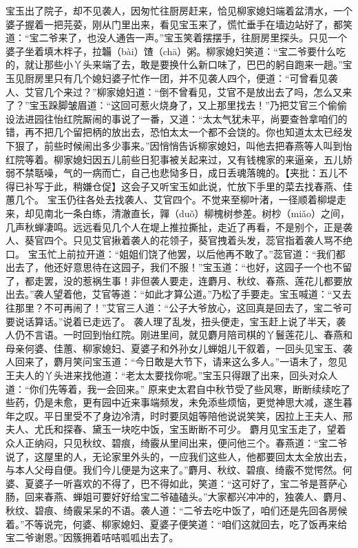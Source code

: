 \documentclass[12pt,oneside]{book}
\begin{document}
宝玉出了院子，却不见袭人，因匆忙往厨房赶来，恰见柳家媳妇端着盆清水，一个婆子握着一把芫荽，刚从门里出来，看见宝玉来了，慌忙垂手在墙边站好了，都笑道：“宝二爷来了，也没人通告一声。”宝玉笑着摆摆手，往厨房里探头。只见一个婆子坐着填木柈子，拉韛（bài）馇（chā）粥。柳家媳妇笑道：“宝二爷要什么吃的，就让那些小丫头来端了去，敢是要换什么新口味了，巴巴的躬自跑来一趟。”宝玉见厨房里只有几个媳妇婆子忙作一团，并不见袭人四个，便道：“可曾看见袭人、艾官几个来过？”柳家媳妇道：“倒不曾看见，艾官不是放出去了吗，怎么又来了？”宝玉跺脚皱眉道：“这回可惹火烧身了，又上那里找去！”乃把艾官三个偷偷设法进园往怡红院厮闹的事说了一番，又道：“太太气犹未平，尚要查咎拿咱们的错，再不把几个留把柄的放出去，恐怕太太一个都不会饶的。你也知道太太已经发下狠了，前些时候闹出多少事来。”因悄悄告诉柳家媳妇，叫他去把春燕等人叫到怡红院等着。柳家媳妇因五儿前些日犯事被关起来过，又有钱槐家的来逼亲，五儿娇弱不禁聒噪，气的一病而亡，自己也悲恸多日，成日丢魂落魄的。【夹批：五儿不得已补写于此，稍嫌仓促】这会子又听宝玉如此说，忙放下手里的菜去找春燕、佳蕙几个。
宝玉仍往各处去找袭人、艾官四个。不觉来至柳叶渚，一径顺着柳堤走来，却见南北一条白练，清澈直长，嚲（duǒ）柳槐树参差。树杪（miǎo）之间，几声秋蝉凄鸣。远远看见几个人在堤上推拉撕扯，走近了再看，不是别个，正是袭人、葵官四个。只见艾官揪着袭人的花领子，葵官拽着头发，蕊官指着袭人骂不绝口。
宝玉忙上前拉开道：“姐姐们饶了他罢，以后他再不敢了。”蕊官道：“我们都出去了，他还好意思待在这园子，我们不服！”宝玉道：“也好，这园子一个也不留了，都走罢，没的惹祸生事！非但袭人要走，连麝月、秋纹、春燕、莲花儿都要放出去。”袭人望着他，艾官等道：“如此才算公道。”乃松了手要走。宝玉喊道：“又去往那里？不可再闹了！”艾官三人道：“公子大爷放心，这回真是回去了，宝二爷可要说话算话。”说着已走远了。
袭人理了乱发，扭头便走，宝玉赶上说了半天，袭人仍不言语。一时回到怡红院。刚进里间，就见麝月陪司棋的丫鬟莲花儿、春燕和母亲何婆、佳蕙、柳家媳妇、夏婆子和外孙女儿蝉姐儿干叙着，一回头见宝玉、袭人回来了，麝月笑问宝玉道：“今日敢是大节下，请来这么多人。”一语未了，忽见王夫人的丫头进来找他道：“老太太要找你呢。”宝玉只得跟了出来，回头对众人道：“你们先等着，我一会回来。”
原来史太君自中秋节受了些风寒，断断续续吃了些药，仍是未愈，更有园中近来事端频发，未免添些烦恼，更觉神思大减，遂生暮年之叹。平日里受不了身边冷清，时时要凤姐等陪他说说笑笑，因拉上王夫人、邢夫人、尤氏和探春、黛玉一块吃中饭，宝玉断断不可少。
麝月见宝玉走了，望着众人正纳闷，只见秋纹、碧痕，绮霰从里间出来，便问他三个。春燕道：“宝二爷说了，这屋里的人，无论家里外头的，一应我们这些人，他都要回太太全放出去，与本人父母自便。我们今儿便是为这来了。”麝月、秋纹、碧痕、绮霰不觉愕然。何婆、夏婆子一听喜欢的不得了，巴不得如此，笑道：“这可好了，宝二爷是菩萨心肠，回来春燕、蝉姐可要好好给宝二爷磕磕头。”大家都兴冲冲的，独袭人、麝月、秋纹、碧痕、绮霰呆呆的不语。袭人道：“二爷去吃中饭了，咱们还是先回各房候着。”不等说完，何婆、柳家媳妇、夏婆子便笑道：“咱们这就回去，吃了饭再来给宝二爷谢恩。”因簇拥着咭咭呱呱出去了。
\end{document}
